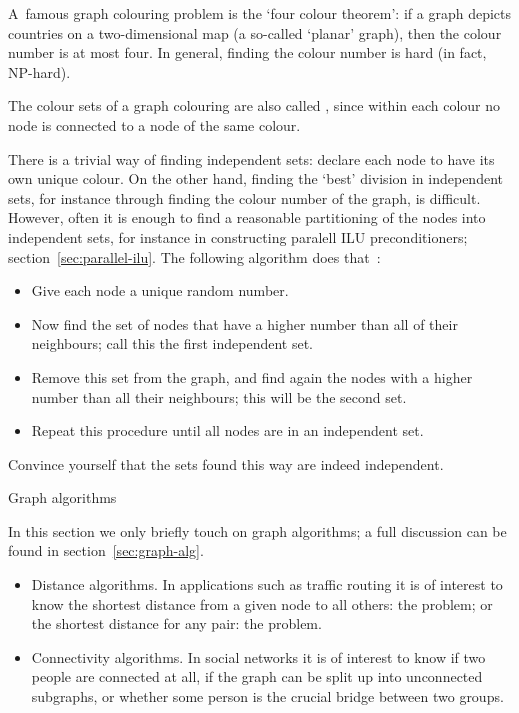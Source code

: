 A~famous graph colouring problem is the `four colour theorem': if
a graph depicts countries on a two-dimensional map (a so-called
`planar' graph), then the colour number is at most four.
In general, finding the colour number is hard (in fact, NP-hard).

The colour sets of a graph colouring are also called
, since within each colour no node is
connected to a node of the same colour.

There is a trivial way of finding independent sets: declare each node
to have its own unique colour. On the other hand, finding the `best'
division in independent sets, for instance through finding the colour
number of the graph, is difficult. However, often it is enough to find
a reasonable partitioning of the nodes into independent sets, for
instance in constructing paralell ILU preconditioners;
section~\ref{sec:parallel-ilu}. The following algorithm does
that~\cite{jopl94,Luby:parallel}:
\begin{itemize}
\item Give each node a unique random number.
\item Now find the set of nodes that have a higher number than all of
  their neighbours; call this the first independent set.
\item Remove this set from the graph, and find again the nodes with a
  higher number than all their neighbours; this will be the second
  set.
\item Repeat this procedure until all nodes are in an independent set.
\end{itemize}
\begin{exercise}
  Convince yourself that the sets found this way are indeed independent.
\end{exercise}


 {Graph algorithms}

In this section we only briefly touch on graph algorithms; a full
discussion can be found in section~\ref{sec:graph-alg}.

\begin{itemize}
\item Distance algorithms. In applications such as traffic routing it
  is of interest to know the shortest distance from a given node to
  all others: the  problem;
  or the shortest distance for any pair: the
   problem.
\item Connectivity algorithms. In social networks it is of interest to
  know if two people are connected at all, if the graph can be split
  up into unconnected subgraphs, or whether some person is the crucial
  bridge between two groups.
\end{itemize}

